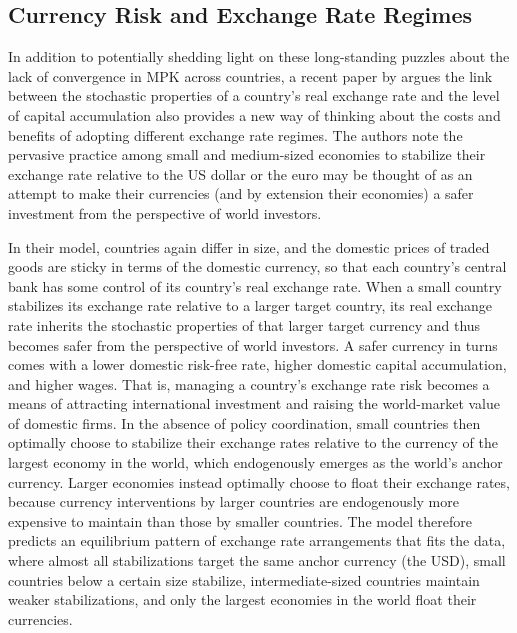 \documentclass{ar-1col}
\begin{document}
\subsection{Currency Risk and Exchange Rate Regimes\label{sec_regimes}}

In addition to potentially shedding light on these long-standing puzzles about the lack of convergence in MPK across countries, a recent paper by \citet{HassanMertensZhang2020} argues the link between the stochastic properties of a country's real exchange rate and the level of capital accumulation also provides a new way of thinking about the costs and benefits of adopting different exchange rate regimes. The authors note the pervasive practice among small and medium-sized economies to stabilize their exchange rate relative to the US dollar or the euro \citep{ilzetzki2018exchange} may be thought of as an attempt to make their currencies (and by extension their economies) a safer investment from the perspective of world investors. 

In their model, countries again differ in size, and the domestic prices of traded goods are sticky in terms of the domestic currency, so that each country's central bank has some control of its country's real exchange rate. When a small country stabilizes its exchange rate relative to a larger target country, its real exchange rate inherits the stochastic properties of that larger target currency and thus becomes safer from the perspective of world investors. A safer currency in turns comes with a lower domestic risk-free rate, higher domestic capital accumulation, and higher wages. That is, managing a country's exchange rate risk becomes a means of attracting international investment and raising the world-market value of domestic firms. In the absence of policy coordination, small countries then optimally choose to stabilize their exchange rates relative to the currency of the largest economy in the world, which endogenously emerges as the world's anchor currency. Larger economies instead optimally choose to float their exchange rates, because currency interventions by larger countries are endogenously more expensive to maintain than those by smaller countries. The model therefore predicts an equilibrium pattern of exchange rate arrangements that fits the data, where almost all stabilizations target the same anchor currency (the USD), small countries below a certain size stabilize, intermediate-sized countries maintain weaker stabilizations, and only the largest economies in the world float their currencies. 
\end{document}

